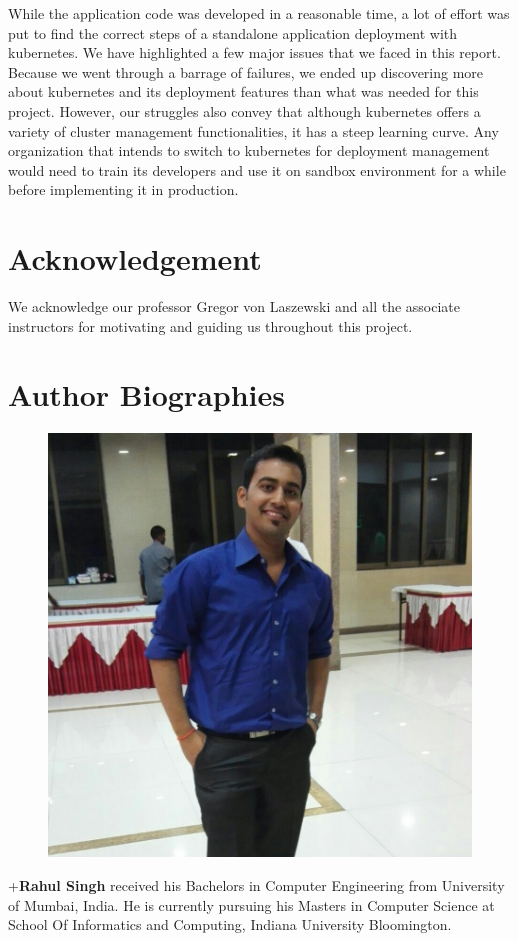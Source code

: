 \documentclass[9pt,twocolumn,twoside]{../../styles/osajnl}
\begin{document}
While the application code was developed in a reasonable time, a lot
of effort was put to find the correct steps of a standalone
application deployment with kubernetes. We have highlighted a few
major issues that we faced in this report. Because we went through a
barrage of failures, we ended up discovering more about kubernetes and
its deployment features than what was needed for this
project. However, our struggles also convey that although kubernetes
offers a variety of cluster management functionalities, it has a steep
learning curve. Any organization that intends to switch to kubernetes
for deployment management would need to train its developers and use
it on sandbox environment for a while before implementing it in
production.

\section{Acknowledgement}

We acknowledge our professor Gregor von Laszewski and all the
associate instructors for motivating and guiding us throughout this
project.


 

\section*{Author Biographies}
\begingroup
\setlength\intextsep{0pt}
\begin{minipage}[t][3.2cm][t]{1.0\columnwidth} %
  \begin{figure}
    \includegraphics[width=0.25\columnwidth]{images/rahul_singh.jpg}
  \end{figure}
  \noindent
+{\bfseries Rahul Singh} received his Bachelors in Computer
Engineering from University of Mumbai, India. He is currently pursuing
his Masters in Computer Science at School Of Informatics and
Computing, Indiana University Bloomington.

\end{minipage}
\endgroup
\end{document}
